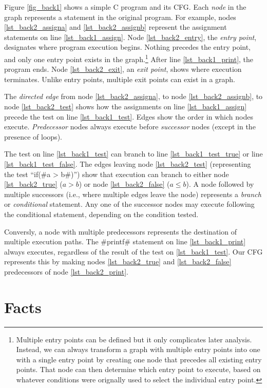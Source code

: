 \documentclass[12pt]{report}
\begin{document}
Figure \ref{fig_back1} shows a simple C program and its CFG. Each
\emph{node} in the graph represents a statement in the original
program. For example, nodes \ref{lst_back2_assigna} and \ref{lst_back2_assignb}
 represent the assignment statements on
line \ref{lst_back1_assign}. Node \ref{lst_back2_entry}, the \emph{entry point},
designates where program execution begins. Nothing precedes the entry
point, and only one entry point exists in the graph.\footnote{Multiple
  entry points can be defined but it only complicates later
  analysis. Instead, we can always transform a graph with multiple
  entry points into one with a single entry point by creating one node
  that precedes all existing entry points. That node can then
  determine which entry point to execute, based on whatever conditions
  were orignally used to select the individual entry point.} After
line \ref{lst_back1_print}, the program ends. Node \ref{lst_back2_exit}, an \emph{exit
  point}, shows where execution terminates. Unlike entry points,
multiple exit points can exist in a graph.

The \emph{directed edge} from node \ref{lst_back2_assigna}, to node
\ref{lst_back2_assignb}, to node \ref{lst_back2_test} shows how the
assignments on line \ref{lst_back1_assign} precede the test on line
\ref{lst_back1_test}. Edges show the order in which nodes
execute. \emph{Predecessor} nodes always execute before
\emph{successor} nodes (except in the presence of loops).

The test on line \ref{lst_back1_test} can branch to line
\ref{lst_back1_test_true} or line \ref{lst_back1_test_false}. The
edges leaving node \ref{lst_back2_test} (representing the test ``if(#a > b#)'') 
show that execution can branch to either node
\ref{lst_back2_true} ($a > b$) or node \ref{lst_back2_false} ($a \leq
b$). A node followed by multiple successors (i.e., where multiple
edges leave the node) represents a \emph{branch} or \emph{conditional}
statement. Any one of the successor nodes may execute following the
conditional statement, depending on the condition tested.

Conversly, a node with multiple predecessors represents the
destination of multiple execution paths. The #printf# statement on
line \ref{lst_back1_print} always executes, regardless of the result
of the test on \ref{lst_back1_test}. Our CFG represents this by making
nodes \ref{lst_back2_true} and \ref{lst_back2_false} predecessors of
node \ref{lst_back2_print}.

\section{Facts}
\end{document}
